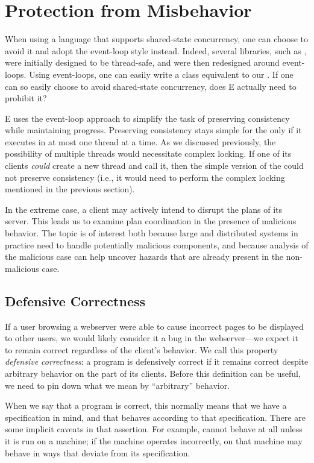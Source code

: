 \documentclass{llncs}
\begin{document}
\section{Protection from Misbehavior}

When using a language that supports shared-state concurrency, one can
choose to avoid it and adopt the event-loop style instead. Indeed,
several  libraries, such as , were initially
designed to be thread-safe, and were then redesigned around
event-loops. Using event-loops, one can easily write a 
class equivalent to our .  If one can so easily
choose to avoid shared-state concurrency, does E actually need to
prohibit it?

E uses the event-loop approach to simplify the task of preserving
consistency while maintaining progress. Preserving consistency stays
simple for the  only if it executes in at most one
thread at a time.  As we discussed previously, the possibility of
multiple threads would necessitate complex locking. If one of its clients
\emph{could} create a new thread and call it, then the simple version
of the  could not preserve consistency (i.e., it
would need to perform the complex locking mentioned in the previous
section). 

In the extreme case, a client may actively intend to disrupt the plans
of its server.  This leads us to examine plan coordination in the
presence of malicious behavior.  The topic is of interest both because
large and distributed systems in practice need to handle potentially
malicious components, and because analysis of the malicious case can
help uncover hazards that are already present in the non-malicious case.

\subsection{Defensive Correctness}

If a user browsing a webserver were able to cause incorrect pages to
be displayed to other users, we would likely consider it a bug in the
webserver---we expect it to remain correct regardless of the client's
behavior.  We call this property \emph{defensive correctness}: a
program  is defensively correct if it remains correct despite
arbitrary behavior on the part of its clients.  Before this definition
can be useful, we need to pin down what we mean by ``arbitrary''
behavior.

When we say that a program  is correct, this normally means
that we have a specification in mind, and that  behaves
according to that specification.  There are some implicit caveats in
that assertion. For example,  cannot behave at all unless it
is run on a machine; if the machine operates incorrectly,  on
that machine may behave in ways that deviate from its specification.
\end{document}
